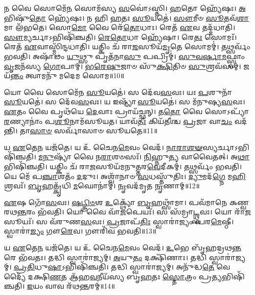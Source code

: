 𑌨 𑌵𑍈 𑌸𑍋𑌮𑍇᳴\-\ul{𑌨} 𑌸𑍋𑌮᳴𑌸𑍍𑌯 \ul{𑌸}\-𑌵𑍋॑\-𑌽𑌸𑍍𑌤𑌿।
\-\ul{𑌹}\-𑌤𑍋 𑌹𑍍𑌯𑍇᳴𑌷𑌃।
\-\ul{𑌅}\-𑌭𑌿𑌷𑍁᳴\-\ul{𑌤𑍋} 𑌹𑍍𑌯𑍇᳴𑌷𑌃।
𑌨 𑌹𑌿 \ul{𑌹}\-𑌤𑌃 \ul{𑌸𑍂}\-𑌯𑌤𑍇॑।
\-\ul{𑌸𑍗}\-𑌮𑍀𑍞 \ul{𑌸𑍂}\-𑌤𑌵᳴\-\ul{𑌶𑌾}\-𑌮𑌾 𑌲᳴𑌭𑌤𑍇।
𑌸𑍋\-\ul{𑌮𑍋} 𑌵𑍈 𑌰𑍇᳴\-\ul{𑌤𑍋}\-𑌧𑌾𑌃।
𑌰𑍇𑌤᳴ \ul{𑌏}\-𑌵 𑌤𑌦𑍍𑌦᳴𑌧𑌾𑌤𑌿।
\-\ul{𑌸𑍗}\-𑌮𑍍𑌯𑌰𑍍𑌚𑌾\-𑌽𑌭𑌿𑌷𑌿᳴𑌞𑍍𑌚𑌤𑌿।
\-\ul{𑌰𑍇}\-\-\ul{𑌤𑍋}\-𑌧𑌾 𑌹𑍍𑌯𑍇᳴𑌷𑌾।
𑌰𑍇\-\ul{𑌤𑌃} 𑌸𑍋𑌮𑌃᳴।
𑌰𑍇𑌤᳴ \ul{𑌏}\-𑌵𑌾𑌸𑍍𑌮𑌿᳴𑌨𑍍𑌦𑌧𑌾𑌤𑌿।
𑌯𑌤𑍍𑌕𑌿𑌂 𑌚᳴ 𑌰𑌾\-\ul{𑌜}\-𑌸𑍂𑌯᳴\-\ul{𑌮𑍃}\-𑌤𑍇 𑌸𑍋𑌮𑌮𑍍॑।
𑌤𑌥𑍍𑌸𑌰𑍍𑌵𑌂᳴ 𑌭𑌵𑌤𑌿।
𑌅𑌷𑌾᳴𑌢𑌂 \ul{𑌯𑍁}\-𑌥𑍍𑌸𑍁 𑌪𑍃𑌤᳴𑌨𑌾\-\ul{𑌸𑍁} 𑌪𑌪𑍍𑌰𑌿𑌮𑍍॑।
\-\ul{𑌸𑍁}\-\-\ul{𑌵}\-\-\ul{𑌰𑍍}\-𑌷𑌾\-\ul{𑌮}\-𑌫𑍍𑌸𑍍𑌵𑌾𑌂 \ul{𑌵𑍃}\-𑌜𑌨᳴𑌸𑍍𑌯 \ul{𑌗𑍋}\-𑌪𑌾𑌮𑍍।
\-\ul{𑌭}\-\-\ul{𑌰𑍇}\-\-\ul{𑌷𑍁}\-𑌜𑌾𑍞 𑌸𑍁᳴\-\ul{𑌕𑍍𑌷𑌿}\-𑌤𑌿𑍞 \ul{𑌸𑍁}\-𑌶𑍍𑌰𑌵᳴𑌸𑌮𑍍।
𑌜𑌯᳴\-\ul{𑌨𑍍𑌤𑌂} 𑌤𑍍𑌵𑌾𑌮𑌨𑍁᳴ 𑌮𑌦𑍇𑌮 𑌸𑍋𑌮॥10॥\anuvakamend[𑌰𑍇\-\ul{𑌤𑌃} 𑌸𑍋𑌮𑌃᳴ \ul{𑌸}\-𑌪𑍍𑌤 𑌚᳴]

𑌯𑍋 𑌵𑍈 𑌸𑍋𑌮𑍇᳴𑌨 \ul{𑌸𑍂}\-𑌯𑌤𑍇॑।
𑌸 𑌦𑍇᳴𑌵\-\ul{𑌸}\-𑌵𑌃।
𑌯𑌃 \ul{𑌪}\-𑌶𑍁𑌨𑌾᳴ \ul{𑌸𑍂}\-𑌯𑌤𑍇॑।
𑌸 𑌦𑍇᳴𑌵\-\ul{𑌸}\-𑌵𑌃।
𑌯 𑌇𑌷𑍍𑌟𑍍𑌯𑌾᳴ \ul{𑌸𑍂}\-𑌯𑌤𑍇॑।
𑌸 𑌮᳴𑌨𑍁𑌷𑍍𑌯\-\ul{𑌸}\-𑌵𑌃।
\-\ul{𑌏}\-𑌤𑌂 𑌵𑍈 𑌪𑍃𑌥᳴𑌯𑍇 \ul{𑌦𑍇}\-𑌵𑌾𑌃 𑌪𑍍𑌰𑌾𑌯᳴𑌚𑍍𑌛𑌨𑍍।
𑌤\-\ul{𑌤𑍋} 𑌵𑍈 𑌸𑍋𑌽𑌪𑍍𑌯𑌾᳴\-\ul{𑌰}\-𑌣𑍍𑌯𑌾𑌨𑌾𑌂॑ 𑌪\-\ul{𑌶𑍂}\-𑌨𑌾𑌮᳴𑌸𑍂𑌯𑌤।
𑌯𑌾𑌵᳴\-\ul{𑌤𑍀𑌃} 𑌕𑌿𑌯᳴𑌤𑍀𑌶𑍍𑌚 \ul{𑌪𑍍𑌰}\-𑌜𑌾 𑌵𑌾\-\ul{𑌚𑌂} 𑌵𑌦᳴𑌨𑍍𑌤𑌿।
𑌤𑌾\-\ul{𑌸𑌾}\-\-\ul{𑍞} 𑌸𑌰𑍍𑌵𑌾᳴𑌸𑌾𑍞 𑌸𑍂𑌯𑌤𑍇॥11॥

𑌯 \ul{𑌏}\-𑌤𑍇\-\ul{𑌨} 𑌯𑌜᳴𑌤𑍇।
𑌯 𑌉᳴ 𑌚𑍈𑌨\-\ul{𑌮𑍇}\-𑌵𑌂 𑌵𑍇𑌦᳴।
\-\ul{𑌨𑌾}\-\-\ul{𑌰𑌾}\-\-\ul{𑌶}\-\-\ul{𑍟}\-𑌸𑍍𑌯𑌰𑍍𑌚𑌾\-𑌽𑌭𑌿𑌷𑌿᳴𑌞𑍍𑌚𑌤𑌿।
\-\ul{𑌮}\-\-\ul{𑌨𑍁}\-𑌷𑍍𑌯𑌾᳴ 𑌵𑍈 𑌨\-\ul{𑌰𑌾}\-𑌶𑍞𑌸𑌃᳴।
\-\ul{𑌨𑌿}\-𑌹𑍍𑌨𑍁\-\ul{𑌤𑍍𑌯} 𑌵𑌾𑌵𑍈𑌤𑌤𑍍।
𑌅\-\ul{𑌥𑌾}\-𑌭𑌿𑌷𑌿᳴𑌞𑍍𑌚𑌤𑌿।
𑌯𑌤𑍍𑌕𑌿𑌂 𑌚᳴ 𑌰𑌾\-\ul{𑌜}\-𑌸𑍂𑌯᳴𑌮𑌨𑍁𑌤𑍍𑌤𑌰\-\ul{𑌵𑍇}\-𑌦𑍀𑌕𑌮𑍍॑।
𑌤𑌥𑍍𑌸𑌰𑍍𑌵𑌂᳴ 𑌭𑌵𑌤𑌿।
𑌯𑍇 𑌮𑍇᳴ 𑌪\-\ul{𑌞𑍍𑌚𑌾}\-𑌶𑌤𑌂᳴ \ul{𑌦}\-𑌦𑍁𑌃।
𑌅𑌶𑍍𑌵𑌾᳴𑌨𑌾𑍞 \ul{𑌸}\-𑌧𑌸𑍍𑌤𑍁᳴𑌤𑌿𑌃।
\-\ul{𑌦𑍍𑌯𑍁}\-𑌮𑌦᳴\-\ul{𑌗𑍍𑌨𑍇} 𑌮\-\ul{𑌹𑌿} 𑌶𑍍𑌰𑌵𑌃᳴।
\-\ul{𑌬𑍃}\-𑌹𑌤𑍍𑌕𑍃᳴𑌧𑌿 \ul{𑌮}\-𑌘𑍋𑌨𑌾॑𑌮𑍍।
\-\ul{𑌨𑍃}\-𑌵𑌦᳴𑌮𑍃𑌤 \ul{𑌨𑍃}\-𑌣𑌾𑌮𑍍॥12॥\anuvakamend[\-\ul{𑌸𑍂}\-\-\ul{𑌯}\-\-\ul{𑌤𑍇} \ul{𑌸}\-𑌧𑌸𑍍𑌤𑍁᳴\-\ul{𑌤𑌿}\-𑌸𑍍𑌤𑍍𑌰𑍀𑌣𑌿᳴ 𑌚]

\-\ul{𑌏}\-𑌷 𑌗𑍋᳴\-\ul{𑌸}\-𑌵𑌃।
\-\ul{𑌷}\-\-\ul{𑌟𑍍𑌤𑍍𑌰𑌿}\-\-\ul{𑍞}\-𑌶 \ul{𑌉}\-𑌕𑍍𑌥𑍍𑌯𑍋᳴ \ul{𑌬𑍃}\-𑌹𑌥𑍍𑌸𑌾᳴𑌮𑌾।
𑌪𑌵᳴𑌮𑌾𑌨𑍇 𑌕𑌣𑍍𑌵𑌰𑌥\-\ul{𑌨𑍍𑌤}\-𑌰𑌂 𑌭᳴𑌵𑌤𑌿।
𑌯𑍋 𑌵𑍈 𑌵𑌾᳴\-\ul{𑌜}\-𑌪𑍇𑌯𑌃᳴।
𑌸 𑌸᳴𑌮𑍍𑌰𑌾\-\ul{𑌟𑍍𑌥𑍍𑌸}\-𑌵𑌃।
𑌯𑍋 𑌰𑌾᳴\-\ul{𑌜}\-𑌸𑍂𑌯𑌃᳴।
𑌸 𑌵᳴𑌰𑍁𑌣\-\ul{𑌸}\-𑌵𑌃।
\-\ul{𑌪𑍍𑌰}\-𑌜𑌾\-𑌪᳴\-\ul{𑌤𑌿𑌃} 𑌸𑍍𑌵𑌾𑌰𑌾॑𑌜𑍍𑌯𑌂 𑌪𑌰\-\ul{𑌮𑍇}\-𑌷𑍍𑌠𑍀।
𑌸𑍍𑌵𑌾𑌰𑌾॑\-\ul{𑌜𑍍𑌯𑌂} 𑌗𑍗\-\ul{𑌰𑍇}\-𑌵।
𑌗𑍗𑌰𑌿᳴𑌵 𑌭𑌵𑌤𑌿॥13॥

𑌯 \ul{𑌏}\-𑌤𑍇\-\ul{𑌨} 𑌯𑌜᳴𑌤𑍇।
𑌯 𑌉᳴ 𑌚𑍈𑌨\-\ul{𑌮𑍇}\-𑌵𑌂 𑌵𑍇𑌦᳴।
\-\ul{𑌉}\-𑌭𑍇 𑌬𑍃᳴𑌹𑌦𑍍𑌰𑌥\-\ul{𑌨𑍍𑌤}\-𑌰𑍇 𑌭᳴𑌵𑌤𑌃।
𑌤𑌦𑍍𑌧𑌿 𑌸𑍍𑌵𑌾𑌰𑌾॑𑌜𑍍𑌯𑌮𑍍।
\-\ul{𑌅}\-𑌯𑍁\-\ul{𑌤𑌂} 𑌦𑌕𑍍𑌷𑌿᳴𑌣𑌾𑌃।
𑌤𑌦𑍍𑌧𑌿 𑌸𑍍𑌵𑌾𑌰𑌾॑𑌜𑍍𑌯𑌮𑍍।
\-\ul{𑌪𑍍𑌰}\-\-\ul{𑌤𑌿}\-𑌧𑍁\-\ul{𑌷𑌾}\-\-𑌽𑌭𑌿𑌷𑌿᳴𑌞𑍍𑌚𑌤𑌿।
𑌤𑌦𑍍𑌧𑌿 𑌸𑍍𑌵𑌾𑌰𑌾॑𑌜𑍍𑌯𑌮𑍍।
𑌅𑌨𑍁᳴𑌦𑍍𑌧\-\ul{𑌤𑍇} 𑌵𑍇𑌦𑍍𑌯𑍈᳴ 𑌦𑌕𑍍𑌷𑌿\-\ul{𑌣}\-𑌤 𑌆᳴𑌹\-\ul{𑌵}\-𑌨𑍀𑌯᳴𑌸𑍍𑌯 𑌬𑍃\-\ul{𑌹}\-𑌤𑌃 \ul{𑌸𑍍𑌤𑍋}\-𑌤𑍍𑌰𑌂 𑌪𑍍𑌰\-\ul{𑌤𑍍𑌯}\-𑌭𑌿𑌷𑌿᳴𑌞𑍍𑌚𑌤𑌿।
\-\ul{𑌇}\-𑌯𑌂 𑌵𑌾𑌵 𑌰᳴𑌥\-\ul{𑌨𑍍𑌤}\-𑌰𑌮𑍍॥14॥

